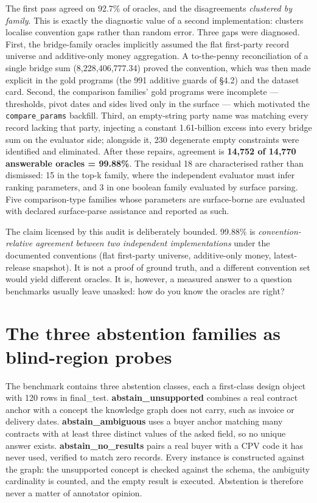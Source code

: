 \documentclass[10pt]{article} %
\begin{document}
The first pass agreed on 92.7\% of oracles, and the disagreements \emph{clustered by family}. This is exactly the diagnostic value of a second implementation: clusters localise convention gaps rather than random error. Three gaps were diagnosed. First, the bridge-family oracles implicitly assumed the flat first-party record universe and additive-only money aggregation. A to-the-penny reconciliation of a single bridge sum (8,228,406,777.34) proved the convention, which was then made explicit in the gold programs (the 991 additive guards of \S4.2) and the dataset card. Second, the comparison families' gold programs were incomplete --- thresholds, pivot dates and sides lived only in the surface --- which motivated the \texttt{compare\_params} backfill. Third, an empty-string party name was matching every record lacking that party, injecting a constant 1.61-billion excess into every bridge sum on the evaluator side; alongside it, 230 degenerate empty constraints were identified and eliminated. After these repairs, agreement is \textbf{14,752 of 14,770 answerable oracles = 99.88\%}. The residual 18 are characterised rather than dismissed: 15 in the top-k family, where the independent evaluator must infer ranking parameters, and 3 in one boolean family evaluated by surface parsing. Five comparison-type families whose parameters are surface-borne are evaluated with declared surface-parse assistance and reported as such.

The claim licensed by this audit is deliberately bounded. 99.88\% is \emph{convention-relative agreement between two independent implementations} under the documented conventions (flat first-party universe, additive-only money, latest-release snapshot). It is not a proof of ground truth, and a different convention set would yield different oracles. It is, however, a measured answer to a question benchmarks usually leave unasked: how do you know the oracles are right?

\section{The three abstention families as blind-region probes}\label{sec:the-three-abstention-families-as-blind-r}

The benchmark contains three abstention classes, each a first-class design object with 120 rows in final\_test. \textbf{abstain\_unsupported} combines a real contract anchor with a concept the knowledge graph does not carry, such as invoice or delivery dates. \textbf{abstain\_ambiguous} uses a buyer anchor matching many contracts with at least three distinct values of the asked field, so no unique answer exists. \textbf{abstain\_no\_results} pairs a real buyer with a CPV code it has never used, verified to match zero records. Every instance is constructed against the graph: the unsupported concept is checked against the schema, the ambiguity cardinality is counted, and the empty result is executed. Abstention is therefore never a matter of annotator opinion.
\end{document}
